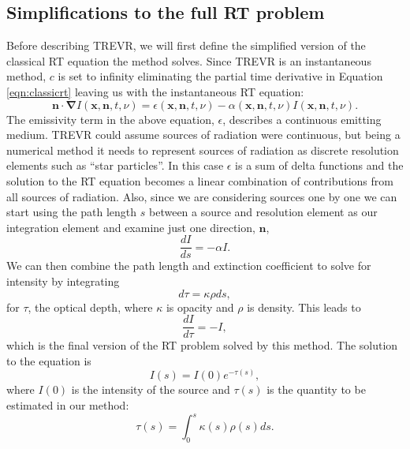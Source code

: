 \documentclass[fleq,usenatbib]{mnras}
\newcommand{\acro}{TREVR}
\begin{document}
{\subsection{Simplifications to the full RT problem}\label{sec:rteq}
Before describing \acro{}, we will first define the 
simplified version of the classical RT equation the method solves. Since 
\acro{} is an instantaneous method, $c$ is set to infinity eliminating the 
partial time derivative in Equation \ref{eqn:classicrt} leaving us with the 
instantaneous RT equation:
\begin{equation} \label{infcrt}
\mathbf{n \cdot \nabla} I\left(\mathbf{x}, \mathbf{n}, t, 
\nu\right) = \epsilon\left(\mathbf{x}, \mathbf{n}, t, \nu\right) - 
\alpha\left(\mathbf{x}, \mathbf{n}, t, \nu\right) 
I\left(\mathbf{x}, \mathbf{n}, t, \nu\right).
\end{equation}
The emissivity term in the above equation, $\epsilon$, describes a continuous 
emitting medium. \acro{} could assume sources of radiation were continuous, but 
being a numerical method it needs to represent sources of radiation as 
discrete resolution elements such as ``star particles''. In this case $\epsilon$ is a sum of delta 
functions and the solution to the RT equation becomes a linear combination of 
contributions from all sources of radiation. Also, since we are considering 
sources one by one we can start using the path length $s$ between a source and 
resolution element as our integration element and examine just one direction, $\mathbf{n}$,
\begin{equation}
\label{eqn:combtransfer}
\frac{dI}{ds} = -\alpha I.
\end{equation}
We can then combine the path length and extinction coefficient to solve for 
intensity by integrating 
\begin{equation}
\label{eqn:dtau}
d\tau = \kappa \rho ds, 
\end{equation}
for $\tau$, the optical depth, where $\kappa$ is opacity and $\rho$ is 
density. This leads to
\begin{equation}
\label{eqn:absorbtransfer}
\frac{dI}{d\tau} = -I,
\end{equation}
which is the final version of the RT problem solved by this method. The 
solution to the equation is 
\begin{equation}
\label{eqn:ient}
I(s) = I(0)e^{-\tau(s)},
\end{equation}
where $I(0)$ is the intensity of the source and $\tau(s)$ is the
quantity to be estimated in our method:
\begin{equation}
\label{eqn:tauint}
\tau(s) = \int_{0}^s \kappa(s) \rho(s) ds.
\end{equation}

}
\end{document}
